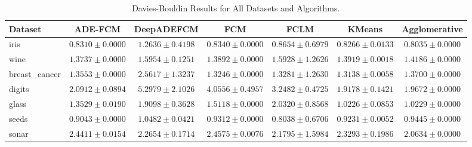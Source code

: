 \begin{table}[ht]
\centering
\caption{Davies-Bouldin Results for All Datasets and Algorithms.}
\label{tab:davies_bouldin}
\begin{tabular}{lcccccc}
\toprule
Dataset & ADE-FCM & DeepADEFCM & FCM & FCLM & KMeans & Agglomerative \\
\midrule
iris & $0.8310\pm0.0000$ & $1.2636\pm0.4198$ & $0.8340\pm0.0000$ & $0.8654\pm0.6979$ & $0.8266\pm0.0133$ & $0.8035\pm0.0000$ \\
wine & $1.3737\pm0.0000$ & $1.5954\pm0.1251$ & $1.3892\pm0.0000$ & $1.5928\pm1.2626$ & $1.3919\pm0.0018$ & $1.4186\pm0.0000$ \\
breast_cancer & $1.3553\pm0.0000$ & $2.5617\pm1.3237$ & $1.3246\pm0.0000$ & $1.3281\pm1.2630$ & $1.3138\pm0.0058$ & $1.3700\pm0.0000$ \\
digits & $2.0912\pm0.0894$ & $5.2979\pm2.1026$ & $4.0556\pm0.4957$ & $3.2482\pm0.4725$ & $1.9178\pm0.1421$ & $1.9672\pm0.0000$ \\
glass & $1.3529\pm0.0190$ & $1.9098\pm0.3628$ & $1.5118\pm0.0000$ & $2.0320\pm0.8568$ & $1.0226\pm0.0853$ & $1.0229\pm0.0000$ \\
seeds & $0.9043\pm0.0000$ & $1.0482\pm0.0421$ & $0.9312\pm0.0000$ & $0.8038\pm0.6706$ & $0.9231\pm0.0052$ & $0.9445\pm0.0000$ \\
sonar & $2.4411\pm0.0154$ & $2.2654\pm0.1714$ & $2.4575\pm0.0076$ & $2.1795\pm1.5984$ & $2.3293\pm0.1986$ & $2.0634\pm0.0000$ \\
\bottomrule
\end{tabular}
\end{table}
